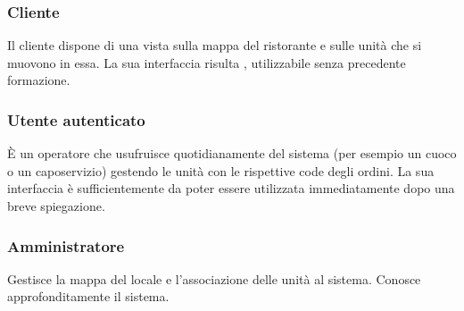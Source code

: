     \subsubsection{Cliente}
    Il cliente dispone di una vista sulla mappa del ristorante e sulle unità che si muovono in essa. La sua interfaccia risulta , utilizzabile senza precedente formazione.

    \subsubsection{Utente autenticato}
    È un operatore che usufruisce quotidianamente del sistema (per esempio un cuoco o un caposervizio) gestendo le unità con le rispettive code degli ordini. La sua interfaccia è sufficientemente  da poter essere utilizzata immediatamente dopo una breve spiegazione.

    \subsubsection{Amministratore}
    Gestisce la mappa del locale e l'associazione delle unità al sistema. Conosce approfonditamente il sistema.
    
    \newpage
    